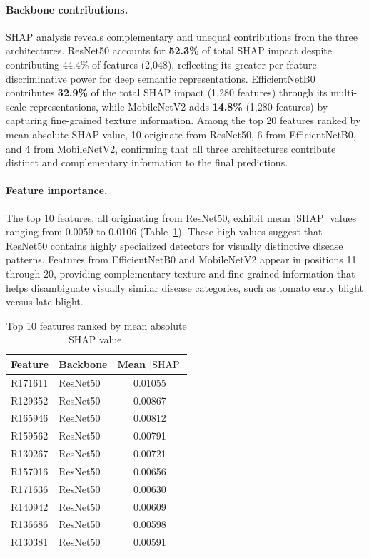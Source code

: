 \documentclass[pdflatex,sn-basic]{sn-jnl}
\begin{document}
\paragraph{Backbone contributions.}
SHAP analysis reveals complementary and unequal contributions from the three architectures. ResNet50 accounts for \textbf{52.3\%} of total SHAP impact despite contributing 44.4\% of features (2,048), reflecting its greater per-feature discriminative power for deep semantic representations. EfficientNetB0 contributes \textbf{32.9\%} of the total SHAP impact (1,280 features) through its multi-scale representations, while MobileNetV2 adds \textbf{14.8\%} (1,280 features) by capturing fine-grained texture information. Among the top 20 features ranked by mean absolute SHAP value, 10 originate from ResNet50, 6 from EfficientNetB0, and 4 from MobileNetV2, confirming that all three architectures contribute distinct and complementary information to the final predictions.

\paragraph{Feature importance.}
The top 10 features, all originating from ResNet50, exhibit mean $|\text{SHAP}|$ values ranging from 0.0059 to 0.0106 (Table~\ref{tab:shap_detailed}). These high values suggest that ResNet50 contains highly specialized detectors for visually distinctive disease patterns. Features from EfficientNetB0 and MobileNetV2 appear in positions 11 through 20, providing complementary texture and fine-grained information that helps disambiguate visually similar disease categories, such as tomato early blight versus late blight.

\begin{table}[htbp]
\caption{Top 10 features ranked by mean absolute SHAP value.}
\label{tab:shap_detailed}
\begin{tabular*}{\textwidth}{@{\extracolsep\fill}llc@{}}
\toprule
\textbf{Feature} & \textbf{Backbone} & \textbf{Mean $|\text{SHAP}|$} \\
\midrule
R171611 & ResNet50 & 0.01055 \\
R129352 & ResNet50 & 0.00867 \\
R165946 & ResNet50 & 0.00812 \\
R159562 & ResNet50 & 0.00791 \\
R130267 & ResNet50 & 0.00721 \\
R157016 & ResNet50 & 0.00656 \\
R171636 & ResNet50 & 0.00630 \\
R140942 & ResNet50 & 0.00609 \\
R136686 & ResNet50 & 0.00598 \\
R130381 & ResNet50 & 0.00591 \\
\bottomrule
\end{tabular*}
\end{table}
\end{document}
